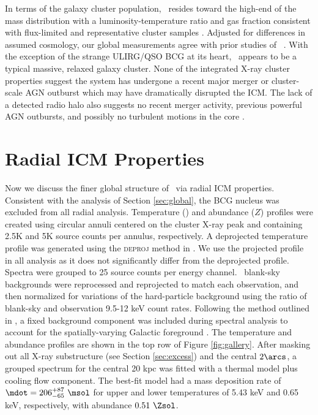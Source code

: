 \documentclass[useAMS,usenatbib]{mn2e}
\begin{document}
In terms of the galaxy cluster population, \rxj\ resides toward the
high-end of the mass distribution with a luminosity-temperature ratio
and gas fraction consistent with flux-limited and representative
cluster samples \citep{hiflugcs2, 2009A&A...498..361P}. Adjusted for
differences in assumed cosmology, our global measurements agree with
prior studies of \irs\ \citep[\eg][]{2000MNRAS.315..269A}. With the
exception of the strange ULIRG/QSO BCG at its heart, \rxj\ appears to
be a typical massive, relaxed galaxy cluster. None of the integrated
X-ray cluster properties suggest the system has undergone a recent
major merger or cluster-scale AGN outburst which may have dramatically
disrupted the ICM. The lack of a detected radio halo also suggests no
recent merger activity, previous powerful AGN outbursts, and possibly
no turbulent motions in the core \citep[\eg][]{2008SSRv..134...93F}.

\section{Radial ICM Properties}
\label{sec:rad}

Now we discuss the finer global structure of \rxj\ via radial ICM
properties. Consistent with the analysis of Section \ref{sec:global},
the BCG nucleus was excluded from all radial analysis. Temperature
(\tx) and abundance ($Z$) profiles were created using circular annuli
centered on the cluster X-ray peak and containing 2.5K and 5K source
counts per annulus, respectively. A deprojected temperature profile
was generated using the \textsc{deproj} method in \xspec. We use the
projected profile in all analysis as it does not significantly differ
from the deprojected profile. Spectra were grouped to 25 source counts
per energy channel. \caldb\ blank-sky backgrounds were reprocessed and
reprojected to match each observation, and then normalized for
variations of the hard-particle background using the ratio of
blank-sky and observation 9.5-12 keV count rates. Following the method
outlined in \citet{2005ApJ...628..655V}, a fixed background component
was included during spectral analysis to account for the
spatially-varying Galactic foreground \citep[see][for more
  detail]{xrayband}. The temperature and abundance profiles are shown
in the top row of Figure \ref{fig:gallery}. After masking out all
X-ray substructure (see Section \ref{sec:excess}) and the central
$2\arcs$, a grouped spectrum for the central 20 kpc was fitted with a
thermal model plus cooling flow component. The best-fit model had a
mass deposition rate of $\mdot = 206^{+87}_{-65} ~\msol$ for upper and
lower temperatures of 5.43 keV and 0.65 keV, respectively, with
abundance $0.51 ~\Zsol$.
\end{document}
